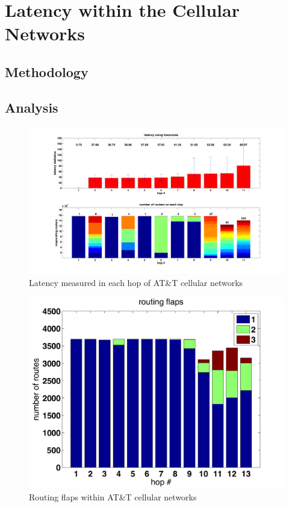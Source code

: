 \section{Latency within the Cellular Networks}

\subsection{Methodology}
\label{sec:methodology}


\subsection{Analysis}
\label{sec:analysis}

\begin{figure}
  \centering
  \includegraphics[width=\linewidth]{../figs/mobile_latency.pdf}
  \caption{Latency measured in each hop of AT\&T cellular networks}
  \label{fig:mobile_latency}
\end{figure}

\begin{figure}
  \centering
  \includegraphics[width=\linewidth]{../figs/routing_flaps.pdf}
  \caption{Routing flaps within AT\&T cellular networks}
  \label{fig:mobile_flaps}
\end{figure}

